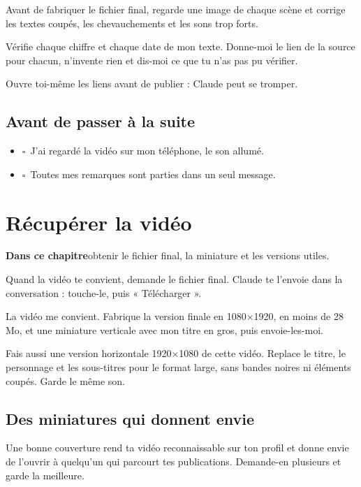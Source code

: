 \documentclass[11pt,oneside,openany]{book}
\newcommand{\coche}{$\square$\ }
\newcommand{\objectif}[1]{\begin{tcolorbox}[enhanced,colback=encre,colframe=encre,arc=2pt,boxrule=0pt,left=9pt,right=9pt,top=6pt,bottom=6pt,fontupper=\small\color{white}]{\color{citron}\bfseries Dans ce chapitre}\quad #1\end{tcolorbox}}
\newenvironment{bilan}{\section*{Avant de passer à la suite}\begin{itemize}[label={}]}{\end{itemize}}
\begin{document}
\begin{acopier}
Avant de fabriquer le fichier final, regarde une image de chaque scène et corrige les textes coupés, les chevauchements et les sons trop forts.
\end{acopier}
\begin{acopier}
Vérifie chaque chiffre et chaque date de mon texte. Donne-moi le lien de la source pour chacun, n'invente rien et dis-moi ce que tu n'as pas pu vérifier.
\end{acopier}
Ouvre toi-même les liens avant de publier : Claude peut se tromper.

\begin{bilan}
  \item \coche J'ai regardé la vidéo sur mon téléphone, le son allumé.
  \item \coche Toutes mes remarques sont parties dans un seul message.
\end{bilan}

\chapter{Récupérer la vidéo}
\objectif{obtenir le fichier final, la miniature et les versions utiles.}
Quand la vidéo te convient, demande le fichier final. Claude te l'envoie dans la conversation : touche-le, puis « Télécharger ».

\begin{acopier}
La vidéo me convient. Fabrique la version finale en 1080×1920, en moins de 28 Mo, et une miniature verticale avec mon titre en gros, puis envoie-les-moi.
\end{acopier}
\begin{acopier}
Fais aussi une version horizontale 1920×1080 de cette vidéo. Replace le titre, le personnage et les sous-titres pour le format large, sans bandes noires ni éléments coupés. Garde le même son.
\end{acopier}

\section{Des miniatures qui donnent envie}
Une bonne couverture rend ta vidéo reconnaissable sur ton profil et donne envie de l'ouvrir à quelqu'un qui parcourt tes publications. Demande-en plusieurs et garde la meilleure.
\end{document}
